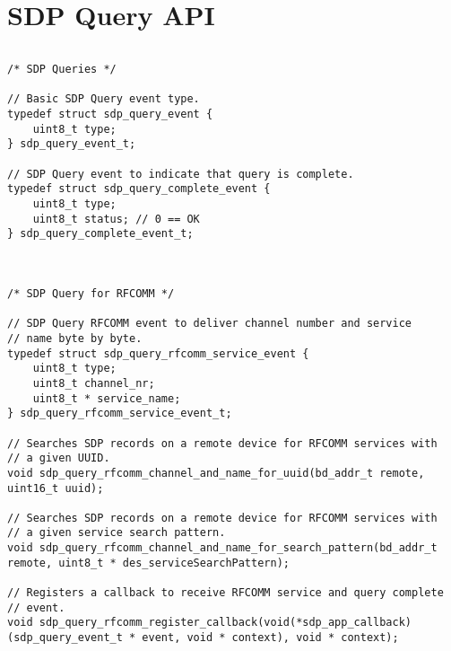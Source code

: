 \section{SDP Query API}
\label{appendix:api_sdp_query}
$ $
 \begin{lstlisting}
/* SDP Queries */

// Basic SDP Query event type.
typedef struct sdp_query_event {
    uint8_t type;
} sdp_query_event_t;

// SDP Query event to indicate that query is complete.
typedef struct sdp_query_complete_event {
    uint8_t type;
    uint8_t status; // 0 == OK
} sdp_query_complete_event_t;



/* SDP Query for RFCOMM */

// SDP Query RFCOMM event to deliver channel number and service 
// name byte by byte.
typedef struct sdp_query_rfcomm_service_event {
    uint8_t type;
    uint8_t channel_nr;
    uint8_t * service_name;
} sdp_query_rfcomm_service_event_t;

// Searches SDP records on a remote device for RFCOMM services with
// a given UUID.
void sdp_query_rfcomm_channel_and_name_for_uuid(bd_addr_t remote, uint16_t uuid);

// Searches SDP records on a remote device for RFCOMM services with 
// a given service search pattern.
void sdp_query_rfcomm_channel_and_name_for_search_pattern(bd_addr_t remote, uint8_t * des_serviceSearchPattern);

// Registers a callback to receive RFCOMM service and query complete
// event. 
void sdp_query_rfcomm_register_callback(void(*sdp_app_callback)(sdp_query_event_t * event, void * context), void * context);
\end{lstlisting}
\pagebreak